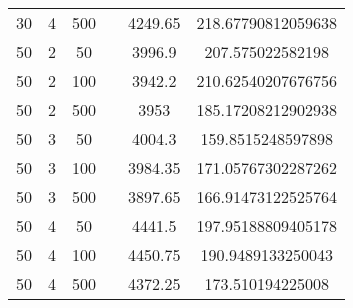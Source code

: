 {\begin{longtabu}{S
S
S
S
S[round-mode=places, round-precision=0]
S[round-mode=places, round-precision=0]}
30 & 4 & 500 & & 4249.65 & 218.67790812059638 \\
50 & 2 & 50 & & 3996.9 & 207.575022582198 \\
50 & 2 & 100 & & 3942.2 & 210.62540207676756 \\
50 & 2 & 500 & & 3953 & 185.17208212902938 \\
50 & 3 & 50 & & 4004.3 & 159.8515248597898 \\
50 & 3 & 100 & & 3984.35 & 171.05767302287262 \\
50 & 3 & 500 & & 3897.65 & 166.91473122525764 \\
50 & 4 & 50 & & 4441.5 & 197.95188809405178 \\
50 & 4 & 100 & & 4450.75 & 190.9489133250043 \\
50 & 4 & 500 & & 4372.25 & 173.510194225008 \\
\hline
\end{longtabu}

}

